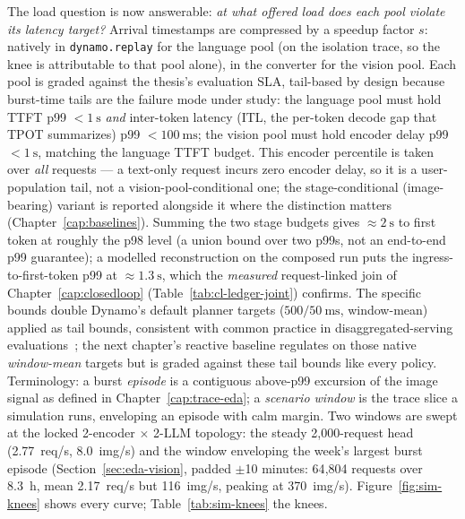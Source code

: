 The load question is now answerable:
\emph{at what offered load does each pool violate its latency target?}
Arrival timestamps are compressed by a speedup factor $s$: natively in
\texttt{dynamo.replay} for the language pool (on the isolation trace, so
the knee is attributable to that pool alone), in the converter for the
vision pool. Each pool is graded against the thesis's evaluation
SLA, tail-based by design because burst-time tails are the
failure mode under study: the language pool must hold TTFT p99
$<\SI{1}{\second}$ \emph{and} inter-token latency (ITL, the per-token
decode gap that TPOT summarizes) p99 $<\SI{100}{\milli\second}$; the vision
pool must hold encoder delay p99
$<\SI{1}{\second}$, matching the language TTFT budget. This encoder
percentile is taken over \emph{all} requests --- a text-only request
incurs zero encoder delay, so it is a user-population tail, not a
vision-pool-conditional one; the stage-conditional (image-bearing)
variant is reported alongside it where the distinction matters
(Chapter~\ref{cap:baselines}). Summing the two
stage budgets gives ${\approx}\SI{2}{\second}$ to first token at roughly
the p98 level (a union bound over two p99s, not an end-to-end p99
guarantee); a modelled reconstruction on the composed run puts the
ingress-to-first-token p99 at ${\approx}\SI{1.3}{\second}$, which the
\emph{measured} request-linked join of Chapter~\ref{cap:closedloop}
(Table~\ref{tab:cl-ledger-joint}) confirms.
The
specific bounds double Dynamo's default planner targets
($500/\SI{50}{\milli\second}$, window-mean) applied as tail bounds,
consistent with common practice in
disaggregated-serving evaluations~\cite{Zhong2024DistServe,Patke2025Chiron};
the next chapter's reactive baseline regulates on those native
\emph{window-mean} targets but is graded against these tail bounds like every
policy. Terminology: a burst \emph{episode} is a contiguous
above-p99 excursion of the image signal as defined in
Chapter~\ref{cap:trace-eda}; a \emph{scenario window} is the trace slice
a simulation runs, enveloping an episode with calm margin. Two windows
are swept at the locked 2-encoder $\times$ 2-LLM
topology: the steady 2{,}000-request head (\SI{2.77}{req/s},
\SI{8.0}{img/s}) and the window enveloping the week's largest burst
episode (Section~\ref{sec:eda-vision}, padded $\pm$10 minutes:
64{,}804 requests over \SI{8.3}{\hour},
mean \SI{2.17}{req/s} but \SI{116}{img/s}, peaking at \SI{370}{img/s}).
Figure~\ref{fig:sim-knees} shows every curve; Table~\ref{tab:sim-knees}
the knees.

